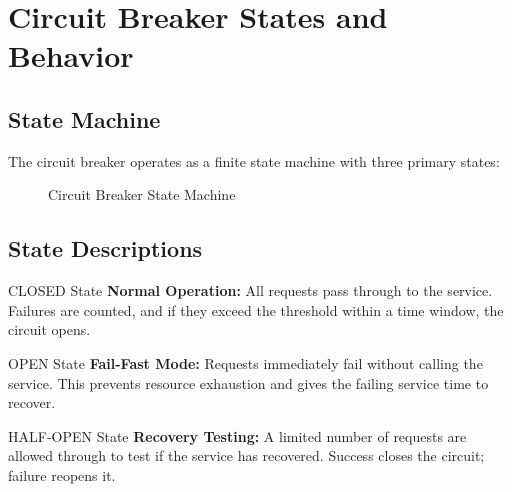 \documentclass[12pt,a4paper]{article}
\begin{document}
\section{Circuit Breaker States and Behavior}

\subsection{State Machine}

The circuit breaker operates as a finite state machine with three primary states:

\begin{figure}[H]
\centering
{}
\caption{Circuit Breaker State Machine}
\end{figure}

\subsection{State Descriptions}

\begin{definitionbox}{CLOSED State}
\textbf{Normal Operation:} All requests pass through to the service. Failures are counted, and if they exceed the threshold within a time window, the circuit opens.
\end{definitionbox}

\begin{definitionbox}{OPEN State}
\textbf{Fail-Fast Mode:} Requests immediately fail without calling the service. This prevents resource exhaustion and gives the failing service time to recover.
\end{definitionbox}

\begin{definitionbox}{HALF-OPEN State}
\textbf{Recovery Testing:} A limited number of requests are allowed through to test if the service has recovered. Success closes the circuit; failure reopens it.
\end{definitionbox}
\end{document}
